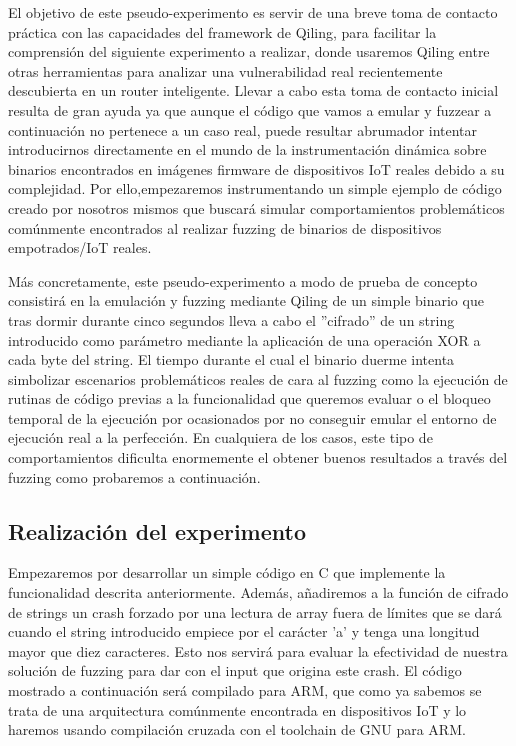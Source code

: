 El objetivo de este pseudo-experimento es servir de una breve toma de contacto práctica con las capacidades del framework de Qiling, para facilitar la comprensión 
del siguiente experimento a realizar, donde usaremos Qiling entre otras herramientas para analizar una vulnerabilidad real recientemente descubierta en un router
inteligente. Llevar a cabo esta toma de contacto inicial resulta de gran ayuda ya que aunque el código que vamos a emular y fuzzear a continuación 
no pertenece a un caso real, puede resultar abrumador intentar introducirnos directamente en el mundo de la instrumentación dinámica sobre binarios encontrados en 
imágenes firmware de dispositivos IoT reales debido a su complejidad. Por ello,empezaremos instrumentando un simple ejemplo de código creado por nosotros mismos que 
buscará simular comportamientos problemáticos comúnmente encontrados al realizar fuzzing de binarios de dispositivos empotrados/IoT reales.\bigskip

Más concretamente, este pseudo-experimento a modo de prueba de concepto consistirá en la emulación y fuzzing mediante Qiling de un simple binario que tras 
dormir durante cinco segundos lleva a cabo el ''cifrado'' de un string introducido como parámetro mediante la aplicación de una operación
XOR a cada byte del string. El tiempo durante el cual el binario duerme intenta simbolizar escenarios problemáticos reales de cara al fuzzing 
como la ejecución de rutinas de código previas a la funcionalidad que queremos evaluar o el bloqueo temporal de la ejecución por ocasionados 
por no conseguir emular el entorno de ejecución real a la perfección. En cualquiera de los casos, este tipo de comportamientos dificulta
enormemente el obtener buenos resultados a través del fuzzing como probaremos a continuación.

\subsection{Realización del experimento}
Empezaremos por desarrollar un simple código en C que implemente la funcionalidad descrita anteriormente. Además, añadiremos a la función de 
cifrado de strings un crash forzado por una lectura de array fuera de límites que se dará cuando el string introducido empiece por el carácter
'a' y tenga una longitud mayor que diez caracteres. Esto nos servirá para evaluar la efectividad de nuestra solución de fuzzing para dar con 
el input que origina este crash. El código mostrado a continuación será compilado para ARM, que como ya sabemos se trata de una arquitectura 
comúnmente encontrada en dispositivos IoT y lo haremos usando compilación cruzada con el toolchain de GNU para ARM.


